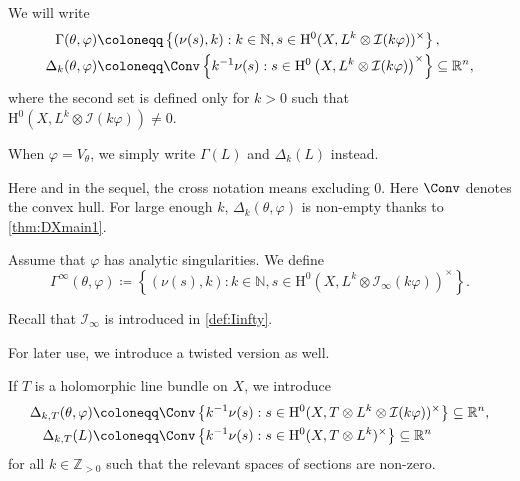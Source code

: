 \begin{definition}\label{def:Okounkov:L484}
    We will write
\[
\begin{aligned}
\Gamma(\theta,\varphi)\coloneqq & \left\{ (\nu(s),k) : k\in \mathbb{N}, s\in \mathrm{H}^0(X,L^k\otimes \mathcal{I}(k\varphi))^{\times} \right\},\\
\Delta_k(\theta,\varphi)\coloneqq & \Conv\left\{ k^{-1}\nu(s): s\in \mathrm{H}^0\left(X,L^k\otimes \mathcal{I}(k\varphi)\right)^{\times} \right\}\subseteq \mathbb{R}^n,
\end{aligned}
\]
\index{$\Gamma(\theta,\varphi)$}
where the second set is defined only for $k>0$ such that $\mathrm{H}^0(X,L^k\otimes \mathcal{I}(k\varphi))\neq 0$.

When $\varphi=V_{\theta}$, we simply write $\Gamma(L)$ and $\Delta_k(L)$ instead.
\end{definition}
Here and in the sequel, the cross notation means excluding $0$.
Here $\Conv$ denotes the convex hull. For large enough $k$, $\Delta_k(\theta,\varphi)$ is non-empty thanks to \cref{thm:DXmain1}.

\begin{definition}\label{def:Okounkov:L500}
    Assume that $\varphi$ has analytic singularities.
We define
    \begin{equation}\label{eq:Weps1}
        \Gamma^{\infty}(\theta,\varphi)\coloneqq \left\{ (\nu(s),k):k\in \mathbb{N}, s\in \mathrm{H}^0(X,L^k\otimes \mathcal{I}_{\infty}(k\varphi))^{\times} \right\}.
    \end{equation}\index{$\Gamma^{\infty}(\theta,\varphi)$}
\end{definition}
Recall that $\mathcal{I}_{\infty}$ is introduced in \cref{def:Iinfty}.



For later use, we introduce a twisted version as well.

\begin{definition}\label{def:DeltakT}
If $T$ is a holomorphic line bundle on $X$, we introduce
\[
\begin{aligned}
\Delta_{k,T}(\theta,\varphi)\coloneqq & \Conv\left\{ k^{-1}\nu(s): s\in \mathrm{H}^0(X,T\otimes L^k\otimes \mathcal{I}(k\varphi))^{\times} \right\}\subseteq \mathbb{R}^n,\\
\Delta_{k,T}(L)\coloneqq & \Conv\left\{ k^{-1}\nu(s): s\in \mathrm{H}^0(X,T\otimes L^k)^{\times} \right\}\subseteq \mathbb{R}^n
\end{aligned}
\]
for all $k\in \mathbb{Z}_{>0}$ such that the relevant spaces of sections are non-zero.
\end{definition}



